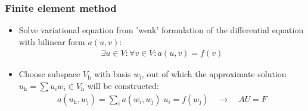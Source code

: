 \begin{frame}
\frametitle{Finite element method}

\begin{itemize}
\item Solve variational equation from 'weak' formulation of the differential equation with bilinear form \(a(u,v)\):
\begin{align*}
\exists u \in V: \forall v \in V: a(u,v) = f(v)
\end{align*}
\item Choose subspace \(V_\text{h}\) with basis \(w_\text{i}\), out of which the approximate solution \(u_\text{h} = \sum u_i w_i \in V_\text{h}\) will be constructed:
\begin{align*}
a(u_\text{h},w_\text{j}) = \sum\limits_i a(w_i,w_\text{j}) \; u_i = f(w_\text{j}) \quad\rightarrow\quad AU = F
\end{align*}
\end{itemize}

\vspace{-0.5em}


\end{frame}
